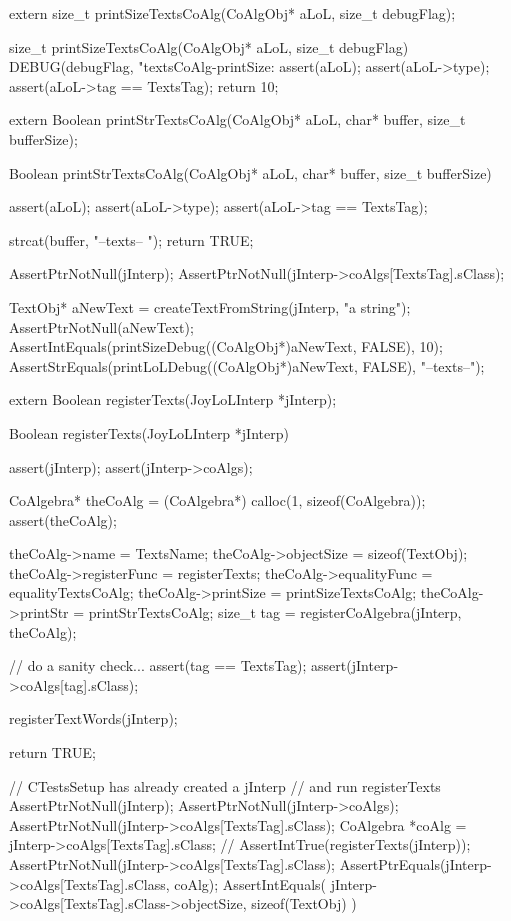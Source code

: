 \startCHeader
extern size_t printSizeTextsCoAlg(CoAlgObj* aLoL, size_t debugFlag);
\stopCHeader

\startCCode
size_t printSizeTextsCoAlg(CoAlgObj* aLoL, size_t debugFlag) {
  DEBUG(debugFlag, "textsCoAlg-printSize: %
  assert(aLoL);
  assert(aLoL->type);
  assert(aLoL->tag == TextsTag);
  return 10;
}
\stopCCode

\startCHeader
extern Boolean printStrTextsCoAlg(CoAlgObj* aLoL,
                                 char* buffer, size_t bufferSize);
\stopCHeader

\startCCode
Boolean printStrTextsCoAlg(CoAlgObj* aLoL,
                          char* buffer, size_t bufferSize) {
  assert(aLoL);
  assert(aLoL->type);
  assert(aLoL->tag == TextsTag);

  strcat(buffer, "--texts-- ");
  return TRUE;
}
\stopCCode


\startCTest
  AssertPtrNotNull(jInterp);
  AssertPtrNotNull(jInterp->coAlgs[TextsTag].sClass);

  TextObj* aNewText = createTextFromString(jInterp, "a string");
  AssertPtrNotNull(aNewText);
  AssertIntEquals(printSizeDebug((CoAlgObj*)aNewText, FALSE), 10);
  AssertStrEquals(printLoLDebug((CoAlgObj*)aNewText, FALSE), "--texts--");
\stopCTest
\stopTestCase
\stopTestSuite

\startTestSuite[registerTexts]

\startCHeader
extern Boolean registerTexts(JoyLoLInterp *jInterp);
\stopCHeader

\startCCode
Boolean registerTexts(JoyLoLInterp *jInterp) {
  assert(jInterp);
  assert(jInterp->coAlgs);
  
  CoAlgebra* theCoAlg    = (CoAlgebra*) calloc(1, sizeof(CoAlgebra));
  assert(theCoAlg);
  
  theCoAlg->name         = TextsName;
  theCoAlg->objectSize   = sizeof(TextObj);
  theCoAlg->registerFunc = registerTexts;
  theCoAlg->equalityFunc = equalityTextsCoAlg;
  theCoAlg->printSize    = printSizeTextsCoAlg;
  theCoAlg->printStr     = printStrTextsCoAlg;
  size_t tag = registerCoAlgebra(jInterp, theCoAlg);
  
  // do a sanity check...
  assert(tag == TextsTag);
  assert(jInterp->coAlgs[tag].sClass);
  
  registerTextWords(jInterp);
  
  return TRUE;
}
\stopCCode


\startCTest
  // CTestsSetup has already created a jInterp
  // and run registerTexts
  AssertPtrNotNull(jInterp);
  AssertPtrNotNull(jInterp->coAlgs);
  AssertPtrNotNull(jInterp->coAlgs[TextsTag].sClass);
  CoAlgebra *coAlg = jInterp->coAlgs[TextsTag].sClass;
//  AssertIntTrue(registerTexts(jInterp));
  AssertPtrNotNull(jInterp->coAlgs[TextsTag].sClass);
  AssertPtrEquals(jInterp->coAlgs[TextsTag].sClass, coAlg);
  AssertIntEquals(
    jInterp->coAlgs[TextsTag].sClass->objectSize,
    sizeof(TextObj)
  )
\stopCTest
\stopTestCase
\stopTestSuite
